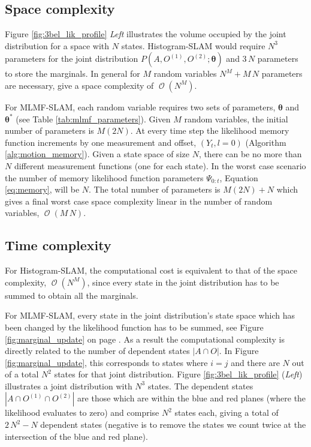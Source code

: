 \documentclass{frontiersSCNS} %
\DeclareMathOperator{\BigO}{\mathcal{O}}
\begin{document}
\subsection{Space complexity}

Figure \ref{fig:3bel_lik_profile} \textit{Left} illustrates the volume occupied by the joint distribution
for a space with $N$ states. Histogram-SLAM would require $N^3$ parameters for the joint distribution 
$P(A,O^{(1)},O^{(2)};\boldsymbol{\theta})$ and $3\,N$ parameters to store the marginals. In general 
for $M$ random variables $N^{M} + M\, N$ parameters are necessary, give a space complexity of $\BigO(N^M)$. 

For MLMF-SLAM, each random variable requires two sets of parameters, $\boldsymbol{\theta}$ and $\boldsymbol{\theta}^*$ 
(see Table \ref{tab:mlmf_parameters}). Given
$M$ random variables, the initial number of parameters is $M (2 N)$.
At every time step the likelihood memory function increments by one measurement and offset, $(Y_t,l=0)$ (Algorithm \ref{alg:motion_memory}).
Given a state space of size $N$, there can be no more than $N$ different measurement functions (one for each state). In
the worst case scenario the number of memory likelihood function parameters $\Psi_{0:t}$, Equation \ref{eq:memory}, will be $N$.
The total number of parameters is $M (2 N) + N$ which gives a final worst case space complexity linear in the number of 
random variables, $\BigO(M\,N)$. 




\subsection{Time complexity}

For Histogram-SLAM, the computational cost is equivalent to that of the space complexity, $\BigO(N^M)$,
since every state in the joint distribution has to be summed to obtain all the marginals.

For MLMF-SLAM, every state in the joint distribution's state space which has been changed by the likelihood function 
has to be summed, see Figure \ref{fig:marginal_update} on page \pageref{fig:marginal_update}. As a result the computational complexity is directly 
related to the number of dependent states $|A \cap O|$. In Figure \ref{fig:marginal_update}, this corresponds to states where $i = j$ and there are $N$ out 
of a total $N^2$ states for that joint distribution. Figure \ref{fig:3bel_lik_profile} (\textit{Left})
illustrates a joint distribution with $N^3$ states. The dependent states $|A \cap O^{(1)} \cap O^{(2)}|$ are those which 
are within the blue and red planes (where the likelihood evaluates to zero) and comprise $N^2$ states each, 
giving a total of $2\,N^2 - N$ dependent states (negative is to remove the states we count twice at the intersection of the blue and red plane). 
\end{document}
